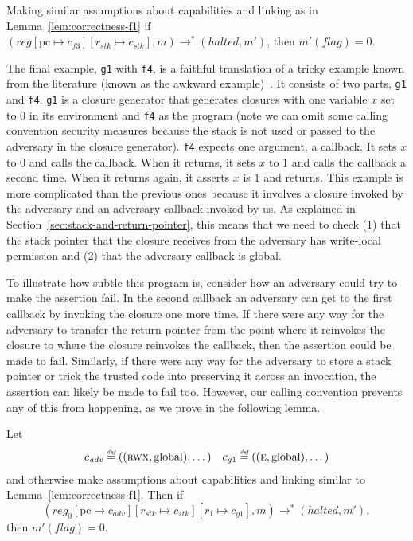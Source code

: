 \documentclass[acmsmall,review]{acmart}\settopmatter{printfolios=true}
\newcommand{\update}[2]{[#1 \mapsto #2]}
\newcommand{\defeq}{\stackrel{\textit{\tiny{def}}}{=}}
\newcommand{\var}[1]{\mathit{#1}}
\newcommand{\pcreg}{\mathrm{pc}}
\newcommand{\reg}{\var{reg}}
\newcommand{\adv}{\var{adv}}
\newcommand{\stk}{\var{stk}}
\newcommand{\flag}{\var{flag}}
\newcommand{\halted}{\mathit{halted}}
\newcommand{\plainperm}[1]{\textsc{#1}}
\newcommand{\entry}{\plainperm{e}}
\newcommand{\rwx}{\plainperm{rwx}}
\newcommand{\plainlocality}[1]{\mathrm{#1}}
\newcommand{\glob}{\plainlocality{global}}
\newcommand{\step}[1][]{\rightarrow_{#1}}
\begin{document}
\begin{lemma}
  \label{lem:correctness-f3}
  Making similar assumptions about capabilities and linking as in
  Lemma~\ref{lem:correctness-f1}
  if $(\reg\update{\pcreg}{c_{f3}}\update{r_\stk}{c_\stk},m) \step^*
  (\halted,m')$, then $m'(\flag) = 0$.
\end{lemma}

The final example, \texttt{\footnotesize{g1}} with \texttt{\footnotesize{f4}},
is a faithful translation of a tricky example  known from the
literature (known as the awkward example)~\citep{pitts_operational_1998,Dreyer:jfp12}. It consists of two
parts, \texttt{\footnotesize{g1}} and \texttt{\footnotesize{f4}}.
\texttt{\footnotesize{g1}} is a closure generator that generates closures with
one variable $x$ set to $0$ in its environment and \texttt{\footnotesize{f4}} as
the program (note we can omit some calling convention security measures
because the stack is not used or passed to the adversary in the closure
generator). \texttt{\footnotesize{f4}} expects one argument, a callback. It sets
$x$ to $0$ and calls the callback. When it returns, it sets $x$ to $1$ and calls
the callback a second time. When it returns again, it asserts $x$ is $1$
and returns. This example is more complicated than the previous ones because it
involves a closure invoked by the adversary and an adversary callback invoked by
us. As explained in Section~\ref{sec:stack-and-return-pointer}, this means that we
need to check (1) that the stack pointer that the closure receives from the
adversary has write-local permission and (2) that the adversary callback is global.

To illustrate how subtle this program is, consider how an adversary could try to
make the assertion fail. In the second callback an adversary can get to the
first callback by invoking the closure one more time. If there were any way for
the adversary to transfer the return pointer from the point where it reinvokes
the closure to where the closure reinvokes the callback, then the assertion
could be made to fail. Similarly, if there were any way for the adversary to
store a stack pointer or trick the trusted code into preserving it across an
invocation, the assertion can likely be made to fail too. However, our calling
convention prevents any of this from happening, as we prove in the following
lemma.

\begin{lemma}
  \label{lem:correctness-g1}
  Let
\[
    \begin{array}{r@{}lr@{}l}
    c_{\var{adv}} & \;\defeq ((\rwx,\glob),\dots) & c_{g1} & \;\defeq ((\entry,\glob),\dots)
    \end{array}
\]
  and otherwise make assumptions about capabilities and linking similar to Lemma~\ref{lem:correctness-f1}.
  Then if
  \[
  (\reg_0\update{\pcreg}{c_\adv}\update{r_\stk}{c_\stk}\update{r_1}{c_{g1}},m) \step^* (\halted,m'),
  \]
  then $m'(\flag) = 0$.
\end{lemma}
\end{document}
